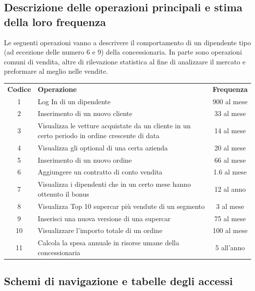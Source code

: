 \documentclass[11pt]{article}
\begin{document}
\newpage

\subsection{Descrizione delle operazioni principali e stima della loro frequenza}

Le seguenti operazioni vanno a descrivere il comportamento di un dipendente tipo
(ad eccezione delle numero 6 e 9) della concessionaria. In parte sono operazioni
comuni di vendita, altre di rilevazione statistica al fine di analizzare il
mercato e preformare al meglio nelle vendite. 

\begin{table}[htbp]
    \centering
    \small
    \begin{tabularx}{\linewidth}{c X c}
      \rowcolor{red!20!}
      \textbf{Codice} & \textbf{Operazione} & \textbf{Frequenza} \\
      1 & Log In di un dipendente & 900 al mese \\
      2 & Inserimento di un nuovo cliente & 33 al mese \\
      3 & Visualizza le vetture acquistate da un cliente in un certo periodo in
      ordine crescente di data & 14 al mese \\
      4 & Visualizza gli optional di una certa azienda & 20 al mese \\
      5 & Inserimento di un nuovo ordine & 66 al mese \\
      6 & Aggiungere un contratto di conto vendita & 1.6 al mese \\
      7 & Visualizza i dipendenti che in un certo mese hanno ottenuto il bonus & 12
      al anno \\
      8 & Visualizza Top 10 supercar più vendute di un segmento & 3 al mese \\
      9 & Inserisci una nuova versione di una supercar & 75 al mese \\
      10 & Visualizzare l'importo totale di un ordine & 100 al mese \\
      11 & Calcola la spesa annuale in risorse umane della concessionaria & 5 all'anno \\
    \end{tabularx}
    \label{tab:tabella_frequenze}
\end{table}
\subsection{Schemi di navigazione e tabelle degli accessi}
\end{document}
